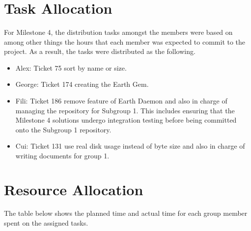 \documentclass[10pt,a4,oneside]{article}
\begin{document}
\section{Task Allocation}

\paragraph{}
For Milestone 4, the distribution tasks amongst the members were based on among other 
things the hours that each member was expected to commit to the project. As a result, the tasks were distributed as the following.

\begin{itemize}
 \item Alex:   Ticket 75 sort by name or size.
 \item George: Ticket 174 creating the Earth Gem.
 \item Fili:   Ticket 186 remove feature of Earth Daemon and also in charge of managing the repository for Subgroup 1. This includes ensuring that the Milestone 4 solutions undergo integration testing before being committed onto the Subgroup 1 repository.
 \item Cui:    Ticket 131 use real disk usage instead of byte size and also in charge of writing documents for group 1.
\end{itemize}

\newpage

\section{Resource Allocation}

\paragraph{}
The table below shows the planned time and actual time for each group member spent on the assigned tasks.
\end{document}
